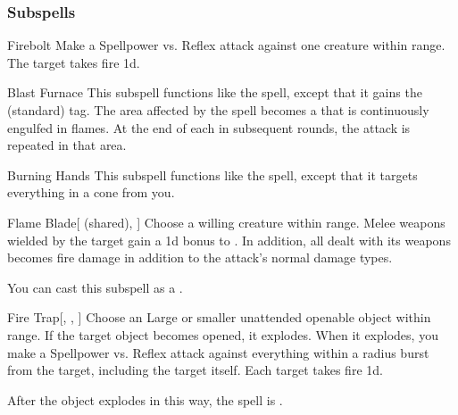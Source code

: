 \subsubsection{Subspells}


\begin{ability}[\nth{1}]{Firebolt}
Make a Spellpower vs. Reflex attack against one creature within \rngmed range.
\hit The target takes fire  \plus1d.
\end{ability}
\vspace{0.25em}


\begin{ability}[\nth{2}]{Blast Furnace}
This subspell functions like the  spell, except that it gains the  (standard) tag.
The area affected by the spell becomes a  that is continuously engulfed in flames.
At the end of each  in subsequent rounds, the attack is repeated in that area.
\end{ability}
\vspace{0.25em}


\begin{ability}[\nth{2}]{Burning Hands}
This subspell functions like the  spell, except that it targets everything in a \arealarge cone from you.
\end{ability}
\vspace{0.25em}


\begin{ability}[\nth{2}]{Flame Blade}[ (shared), ]
Choose a willing creature within \rngclose range.
Melee weapons wielded by the target gain a \plus1d bonus to .
In addition, all  dealt with its weapons becomes fire damage in addition to the attack's normal damage types.

You can cast this subspell as a .
\end{ability}
\vspace{0.25em}


\begin{ability}[\nth{3}]{Fire Trap}[, , ]
Choose an Large or smaller unattended openable object within \rngclose range.
If the target object becomes opened, it explodes.
When it explodes, you make a Spellpower vs. Reflex attack against everything within a \areamed radius burst from the target, including the target itself.
\hit Each target takes fire  \minus1d.

After the object explodes in this way, the spell is .
\end{ability}
\vspace{0.25em}


